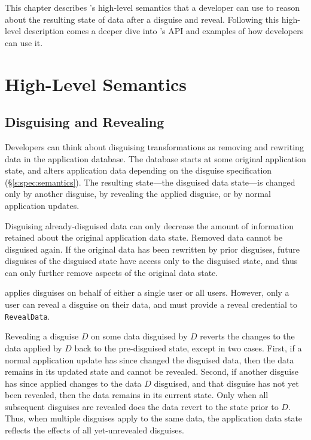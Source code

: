 This chapter describes \sys's high-level semantics that a developer can use to
reason about the resulting state of data after a disguise and reveal. Following
this high-level description comes a deeper dive into \sys's API and examples of
how developers can use it.

\section{High-Level Semantics}
\label{s:hlsemantics}

\subsection{Disguising and Revealing}
Developers can think about disguising transformations as removing and rewriting
data in the application database.
%
The database starts at some original application state, and alters application
data depending on the disguise specification (\S\ref{s:spec:semantics}).  The resulting
state---the disguised data state---is changed only by another disguise, by
revealing the applied disguise, or by normal application updates.
%

%
Disguising already-disguised data can only decrease the amount of information
retained about the original application data state. Removed data cannot be
disguised again. If the original data has been rewritten by prior disguises,
future disguises of the disguised state have access only to the disguised state,
and thus can only further remove aspects of the original data state.
%

%
\sys applies disguises on behalf of either a single user or all users. However,
only a user can reveal a disguise on their data, and must provide a reveal
credential to \texttt{RevealData}.
%

%
Revealing a disguise $D$ on some data disguised by $D$ reverts the changes to
the data applied by $D$ back to the pre-disguised state, except in two cases.
First, if a normal application update has since changed the disguised data, then
the data remains in its updated state and cannot be revealed.
%
Second, if another disguise has since applied changes to the data $D$ disguised,
and that disguise has not yet been revealed, then the data remains in its
current state.
%
Only when all subsequent disguises are revealed does the data revert to the
state prior to $D$.
%
Thus, when multiple disguises apply to the same data, the application data state
reflects the effects of all yet-unrevealed disguises.
%

